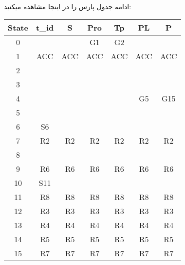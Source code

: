 \begin{center}
\begin{latin}
\begin{tabular}{|c|c|c|c|c|c|c|c|}
\end{tabular}
\end{latin}
\end{center}

ادامه جدول پارس را در اینجا مشاهده میکنید:

\begin{center}
\begin{latin}
\begin{tabular}{|c|c|c|c|c|c|c|}
\hline
State & t\_id  & S                           & Pro                    & Tp                     & PL   & P   \\ \hline
0     &        &                             & G1                     & G2                     &      &     \\ \hline
1     & ACC    & ACC                         & ACC                    & ACC                    & ACC  & ACC \\ \hline
2     &        &                             &                        &                        &      &     \\ \hline
3     &        &                             &                        &                        &      &     \\ \hline
4     &        &                             &                        &                        & G5   & G15 \\ \hline
5     &        &                             &                        &                        &      &     \\ \hline
6     & S6     &                             &                        &                        &      &     \\ \hline
7     & R2     & R2                          & R2                     & R2                     & R2   & R2  \\ \hline
8     &        &                             &                        &                        &      &     \\ \hline
9     & R6     & R6                          & R6                     & R6                     & R6   & R6  \\ \hline
10    & S11    &                             &                        &                        &      &     \\ \hline
11    & R8     & R8                          & R8                     & R8                     & R8   & R8  \\ \hline
12    & R3     & R3                          & R3                     & R3                     & R3   & R3  \\ \hline
13    & R4     & R4                          & R4                     & R4                     & R4   & R4  \\ \hline
14    & R5     & R5                          & R5                     & R5                     & R5   & R5  \\ \hline
15    & R7     & R7                          & R7                     & R7                     & R7   & R7  \\ \hline


\end{tabular}
\end{latin}
\end{center}

